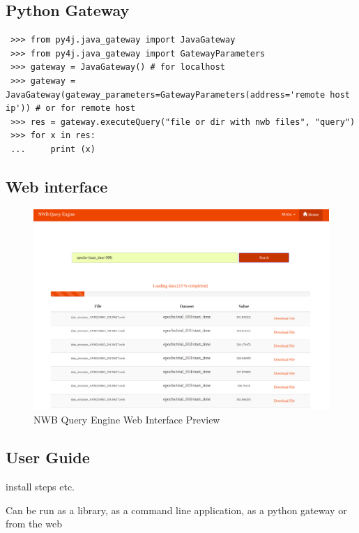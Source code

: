 \documentclass[utf8]{frontiersSCNS} %
\begin{document}
\subsection{Python Gateway}
\label{Python_Gateway}

\begin{lstlisting}
 >>> from py4j.java_gateway import JavaGateway
 >>> from py4j.java_gateway import GatewayParameters
 >>> gateway = JavaGateway() # for localhost
 >>> gateway = JavaGateway(gateway_parameters=GatewayParameters(address='remote host ip')) # or for remote host
 >>> res = gateway.executeQuery("file or dir with nwb files", "query")
 >>> for x in res:
 ...     print (x)
\end{lstlisting}

\subsection{Web interface}
\label{web_interface}

\begin{figure}
  \includegraphics[width=17cm]{nwb-query-engine-web}
\caption{NWB Query Engine Web Interface Preview}
\label{fig:diagram}
\end{figure}

\subsection{User Guide}
install steps etc.

Can be run as a library, as a command line application, as a python gateway or from the web
\end{document}
